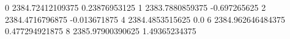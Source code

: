 0 2384.72412109375 0.23876953125
1 2383.7880859375 -0.697265625
2 2384.4716796875 -0.013671875
4 2384.4853515625 0.0
6 2384.962646484375 0.477294921875
8 2385.97900390625 1.49365234375
